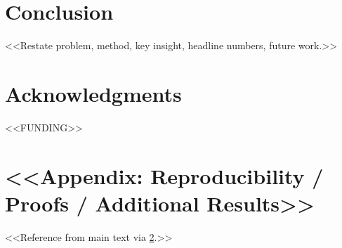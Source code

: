 \documentclass[10pt,letterpaper]{article}
\theoremstyle{plain}
\theoremstyle{definition}
\theoremstyle{remark}
\begin{document}
\section{Conclusion}
\label{sec:conclusion}
<<Restate problem, method, key insight, headline numbers, future work.>>

\section*{Acknowledgments}
<<FUNDING>>

% 
% 

\appendix
\section{<<Appendix: Reproducibility / Proofs / Additional Results>>}
\label{app:repro} %
<<Reference from main text via \cref{app:repro}.>>
\end{document}
